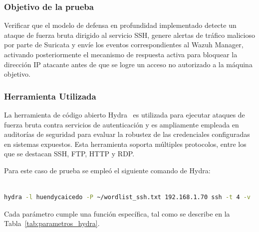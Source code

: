 \subsubsection{Objetivo de la prueba}
\noindent

Verificar que el modelo de defensa en profundidad implementado detecte un ataque de fuerza bruta dirigido al servicio SSH, genere alertas 
de tráfico malicioso por parte de Suricata y envíe los eventos correspondientes al Wazuh Manager, activando posteriormente el mecanismo de 
respuesta activa para bloquear la dirección IP atacante antes de que se logre un acceso no autorizado a la máquina objetivo.

\subsubsection{Herramienta Utilizada}
\noindent

La herramienta de código abierto Hydra~\cite{Hydra2026} es utilizada para ejecutar ataques de fuerza bruta contra servicios de autenticación y es 
ampliamente empleada en auditorías de seguridad para evaluar la robustez de las credenciales configuradas en sistemas expuestos. Esta 
herramienta soporta múltiples protocolos, entre los que se destacan SSH, FTP, HTTP y RDP.

Para este caso de prueba se empleó el siguiente comando de Hydra:

\begin{lstlisting}[language=bash, caption={Comando Hydra utilizado para el ataque de fuerza bruta SSH}, label={lst:hydra_ssh}]

hydra -l huendycaicedo -P ~/wordlist_ssh.txt 192.168.1.70 ssh -t 4 -v

\end{lstlisting}

Cada parámetro cumple una función específica, tal como se describe en la Tabla~\ref{tab:parametros_hydra}.

